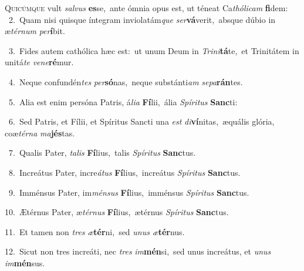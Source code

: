 \lettrine{\initial\textcolor{\initialcolor}{Q}}{uicúmque} vult \textit{sal}\-\textit{vus} \textbf{es}\-se,~\star ante ómnia opus est, ut téneat Ca\-\textit{thó}\-\textit{li}\textit{cam} \textbf{fi}\-dem:\\
{\numbfont\textcolor{\numbcolor}{~2.}}~Quam nisi quisque íntegram inviolatám\textit{que} \textit{ser}\-\textbf{vá}verit,~\star absque dúbio in æ\-\textit{tér}\-\textit{num} \textit{per}\-\textbf{í}bit.\par
{\numbfont\textcolor{\numbcolor}{~3.}}~Fides autem cathólica hæc est:~\dagger ut unum Deum in \textit{Tri}\-\textit{ni}\textbf{tá}te,~\star et Trinitátem in unitá\textit{te} \textit{ve}\-\textit{ne}\textbf{ré}mur.\par
{\numbfont\textcolor{\numbcolor}{~4.}}~Neque confundén\textit{tes} \textit{per}\-\textbf{só}nas,~\star neque substánti\textit{am} \textit{se}\-\textit{pa}\textbf{rán}tes.\par
{\numbfont\textcolor{\numbcolor}{~5.}}~Alia est enim persóna Patris, á\-\textit{li}\-\textit{a} \textbf{Fí}\-lii,~\star ália \textit{Spí}\-\textit{ri}\textit{tus} \textbf{Sanc}\-ti:\par
{\numbfont\textcolor{\numbcolor}{~6.}}~Sed Patris, et Fílii, et Spíritus Sancti una \textit{est} \textit{di}\-\textbf{ví}nitas,~\star æquális glória, coæ\-\textit{tér}\-\textit{na} \textit{ma}\-\textbf{jés}tas.\par
{\numbfont\textcolor{\numbcolor}{~7.}}~Qualis Pater, \textit{ta}\-\textit{lis} \textbf{Fí}\-lius,~\star talis \textit{Spí}\-\textit{ri}\textit{tus} \textbf{Sanc}\-tus.\par
{\numbfont\textcolor{\numbcolor}{~8.}}~Increátus Pater, incre\-\textit{á}\-\textit{tus} \textbf{Fí}\-lius,~\star increátus \textit{Spí}\-\textit{ri}\textit{tus} \textbf{Sanc}\-tus.\par
{\numbfont\textcolor{\numbcolor}{~9.}}~Imménsus Pater, im\-\textit{mén}\-\textit{sus} \textbf{Fí}\-lius,~\star imménsus \textit{Spí}\-\textit{ri}\textit{tus} \textbf{Sanc}\-tus.\par
{\numbfont\textcolor{\numbcolor}{10.}}~Ætérnus Pater, æ\-\textit{tér}\-\textit{nus} \textbf{Fí}\-lius,~\star ætérnus \textit{Spí}\-\textit{ri}\textit{tus} \textbf{Sanc}\-tus.\par
{\numbfont\textcolor{\numbcolor}{11.}}~Et tamen non \textit{tres} \textit{æ}\-\textbf{tér}ni,~\star sed \textit{u}\-\textit{nus} \textit{æ}\-\textbf{tér}nus.\par
{\numbfont\textcolor{\numbcolor}{12.}}~Sicut non tres increáti, nec \textit{tres} \textit{im}\-\textbf{mén}si,~\star sed unus increátus, et \textit{u}\-\textit{nus} \textit{im}\-\textbf{mén}sus.\par
